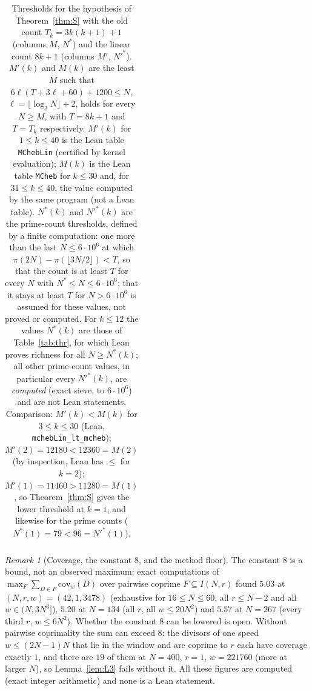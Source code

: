 \documentclass[11pt]{article}
\theoremstyle{definition}
\theoremstyle{remark}
\newtheorem{remark}[theorem]{Remark}
\begin{document}
\begin{table}[!t]
{\begin{tabular}{r r r r r | r r r r r}
\end{tabular}}
\caption{Thresholds for the hypothesis of Theorem~\ref{thm:S} with the old count $T_k=3k(k+1)+1$ (columns $M$, $N^*$) and the linear count $8k+1$ (columns $M'$, $N'^*$). $M'(k)$ and $M(k)$ are the least $M$ such that $6\ell(T+3\ell+60)+1200\le N$, $\ell=\lfloor\log_2N\rfloor+2$, holds for every $N\ge M$, with $T=8k+1$ and $T=T_k$ respectively. $M'(k)$ for $1\le k\le40$ is the Lean table \texttt{MChebLin} (certified by kernel evaluation); $M(k)$ is the Lean table \texttt{MCheb} for $k\le30$ and, for $31\le k\le40$, the value computed by the same program (not a Lean table). $N^*(k)$ and $N'^*(k)$ are the prime-count thresholds, defined by a finite computation: one more than the last $N\le6\cdot10^6$ at which $\pi(2N)-\pi(\lfloor3N/2\rfloor)<T$, so that the count is at least $T$ for every $N$ with $N^*\le N\le6\cdot10^6$; that it stays at least $T$ for $N>6\cdot10^6$ is assumed for these values, not proved or computed. For $k\le12$ the values $N^*(k)$ are those of Table~\ref{tab:thr}, for which Lean proves richness for all $N\ge N^*(k)$; all other prime-count values, in particular every $N'^*(k)$, are \emph{computed} (exact sieve, to $6\cdot10^6$) and are not Lean statements. Comparison: $M'(k)<M(k)$ for $3\le k\le30$ (Lean, \texttt{mchebLin\_lt\_mcheb}); $M'(2)=12180<12360=M(2)$ (by inspection, Lean has $\le$ for $k=2$); $M'(1)=11460>11280=M(1)$, so Theorem~\ref{thm:S} gives the lower threshold at $k=1$, and likewise for the prime counts ($N^*(1)=79<96=N'^*(1)$).}
\label{tab:lin}
\end{table}

\begin{remark}[Coverage, the constant $8$, and the method floor]\label{rem:cov}
The constant $8$ is a bound, not an observed maximum: exact computations of $\max_F\sum_{D\in F}\mathrm{cov}_w(D)$ over pairwise coprime $F\subseteq I(N,r)$ found $5.03$ at $(N,r,w)=(42,1,3478)$ (exhaustive for $16\le N\le60$, all $r\le N-2$ and all $w\in(N,3N^3]$), $5.20$ at $N=134$ (all $r$, all $w\le20N^2$) and $5.57$ at $N=267$ (every third $r$, $w\le6N^2$). Whether the constant $8$ can be lowered is open. Without pairwise coprimality the sum can exceed $8$: the divisors of one speed $w\le(2N-1)N$ that lie in the window and are coprime to $r$ each have coverage exactly $1$, and there are $19$ of them at $N=400$, $r=1$, $w=221760$ (more at larger $N$), so Lemma~\ref{lem:L3} fails without it. All these figures are computed (exact integer arithmetic) and none is a Lean statement.
\end{remark}
\end{document}
